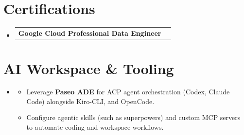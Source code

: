 \documentclass[letterpaper,11pt]{article}
\makeatletter
\newcommand{\resumeItem}[1]{
  \item\small{
    {#1 \vspace{-2pt}}
  }
}
\newcommand{\resumeProjectHeading}[2]{
    \item
    \begin{tabular*}{1.001\textwidth}{l@{\extracolsep{\fill}}r}
      \small#1 & \textbf{\small #2}\\
    \end{tabular*}\vspace{-7pt}
}
\newcommand{\resumeSubHeadingListStart}{\begin{itemize}[leftmargin=0.0in, label={}]}
\newcommand{\resumeSubHeadingListEnd}{\end{itemize}}
\newcommand{\resumeItemListStart}{\begin{itemize}}
\newcommand{\resumeItemListEnd}{\end{itemize}\vspace{-5pt}}
\makeatother
\begin{document}
\section{Certifications}
  \resumeSubHeadingListStart
    \resumeProjectHeading
      {\textbf{Google Cloud Professional Data Engineer}}{}
  \resumeSubHeadingListEnd

\vspace{-12pt}
\section{AI Workspace \& Tooling}
  \resumeSubHeadingListStart
    \item[]
      \resumeItemListStart
        \resumeItem{Leverage \textbf{Paseo ADE} for ACP agent orchestration (Codex, Claude Code) alongside Kiro-CLI, and OpenCode.}
        \resumeItem{Configure agentic skills (such as superpowers) and custom MCP servers to automate coding and workspace workflows.}
      \resumeItemListEnd
  \resumeSubHeadingListEnd
\end{document}
